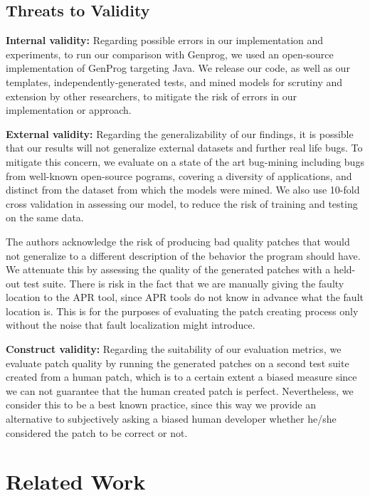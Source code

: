 \documentclass[conference]{IEEEtran}
\begin{document}
\subsection{Threats to Validity} \label{threatsVal}

\noindent\textbf{Internal validity:}
Regarding possible errors in our implementation and experiments, to run our
comparison with Genprog, we used an open-source implementation of GenProg
targeting Java. We release our code, as well as our templates,
independently-generated tests, and mined models for scrutiny and extension by other
researchers, to mitigate the risk of errors in our implementation or approach. 

\noindent\textbf{External validity:} 
Regarding the generalizability of our findings, it is possible 
that our results will not generalize external datasets and further
real life bugs. To mitigate this concern, we evaluate 
on a state of the art bug-mining including bugs from well-known open-source
pograms, covering a diversity of applications, and distinct from the dataset
from which the models were mined.  We also use 10-fold cross validation in
assessing our model, to reduce the risk of training and testing on the same
data.  

The authors acknowledge the risk of producing bad quality patches that would not generalize
to a different description of the behavior the program should have. We attenuate this by 
assessing the quality of the generated patches with a held-out test suite.
There is risk in the fact that we are manually giving the
faulty location to the APR tool, since APR tools do not know in advance what the 
fault location is. This is for the purposes of evaluating the patch creating process
only without the noise that fault localization might introduce.

\noindent\textbf{Construct validity:}
Regarding the suitability of our evaluation metrics, we evaluate patch
quality by running the generated patches on a second test suite created
from a human patch, which is to a certain extent a biased measure since we can
not guarantee that the human created patch is perfect. Nevertheless, we consider this to be a
best known practice, since this way we provide an alternative to subjectively asking a biased human developer
whether he/she considered the patch to be correct or not. 

\section{Related Work} \label{relatedWork}
\end{document}
